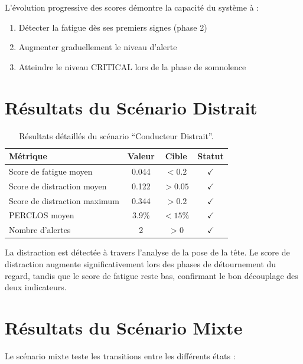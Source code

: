 L'évolution progressive des scores démontre la capacité du système à :
\begin{enumerate}
    \item Détecter la fatigue dès ses premiers signes (phase 2)
    \item Augmenter graduellement le niveau d'alerte
    \item Atteindre le niveau CRITICAL lors de la phase de somnolence
\end{enumerate}

\section{Résultats du Scénario Distrait}

\begin{table}[H]
\centering
\caption{Résultats détaillés du scénario ``Conducteur Distrait''.}
\label{tab:results_distrait}
\renewcommand{\arraystretch}{1.3}
\begin{tabular}{|l|c|c|c|}
\hline
\rowcolor{purple!15}
\textbf{Métrique} & \textbf{Valeur} & \textbf{Cible} & \textbf{Statut} \\
\hline
Score de fatigue moyen & 0.044 & $< 0.2$ & $\checkmark$ \\
\hline
Score de distraction moyen & 0.122 & $> 0.05$ & $\checkmark$ \\
\hline
Score de distraction maximum & 0.344 & $> 0.2$ & $\checkmark$ \\
\hline
PERCLOS moyen & 3.9\% & $< 15\%$ & $\checkmark$ \\
\hline
Nombre d'alertes & 2 & $> 0$ & $\checkmark$ \\
\hline
\end{tabular}
\end{table}

La distraction est détectée à travers l'analyse de la pose de la tête. Le score de distraction augmente significativement lors des phases de détournement du regard, tandis que le score de fatigue reste bas, confirmant le bon découplage des deux indicateurs.

\section{Résultats du Scénario Mixte}

Le scénario mixte teste les transitions entre les différents états :

